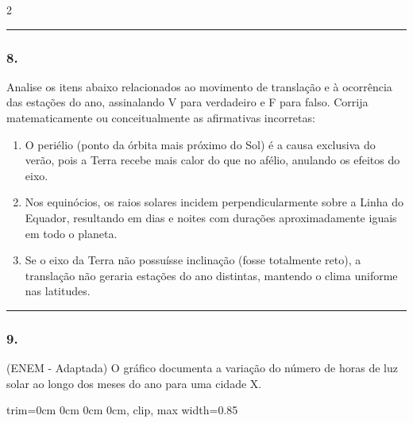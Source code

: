 \documentclass[twoside, 10pt, a4paper]{article}
\newlength{\espacoPreQuestao}\setlength{\espacoPreQuestao}{0.1cm}
\newlength{\espacoQuestao}\setlength{\espacoQuestao}{0.2cm}
\newlength{\espacoAlt}\setlength{\espacoAlt}{0.2cm}
\newcommand{\larguraTikz}{0.85\linewidth}
\begin{document}
\begin{multicols*}{2}
\noindent\textcolor{CorLinha}{\rule{\linewidth}{0.5pt}} 
\par\vspace{\espacoPreQuestao}
\subsubsection*{8.} Analise os itens abaixo relacionados ao movimento de translação e à ocorrência das estações do ano, assinalando V para verdadeiro e F para falso. Corrija matematicamente ou conceitualmente as afirmativas incorretas:
\begin{enumerate}[label=\Roman*., itemsep=\espacoAlt]
    \item O periélio (ponto da órbita mais próximo do Sol) é a causa exclusiva do verão, pois a Terra recebe mais calor do que no afélio, anulando os efeitos do eixo.
    \item Nos equinócios, os raios solares incidem perpendicularmente sobre a Linha do Equador, resultando em dias e noites com durações aproximadamente iguais em todo o planeta.
    \item Se o eixo da Terra não possuísse inclinação (fosse totalmente reto), a translação não geraria estações do ano distintas, mantendo o clima uniforme nas latitudes.
\end{enumerate}
\par\vspace{\espacoQuestao}

\noindent\textcolor{CorLinha}{\rule{\linewidth}{0.5pt}} 
\par\vspace{\espacoPreQuestao}
\subsubsection*{9.} (ENEM - Adaptada) O gráfico documenta a variação do número de horas de luz solar ao longo dos meses do ano para uma cidade X.

\begin{center}
\begin{adjustbox}{trim=0cm 0cm 0cm 0cm, clip, max width=\larguraTikz}
\end{adjustbox}
\end{center}


\end{multicols*}
\end{document}
